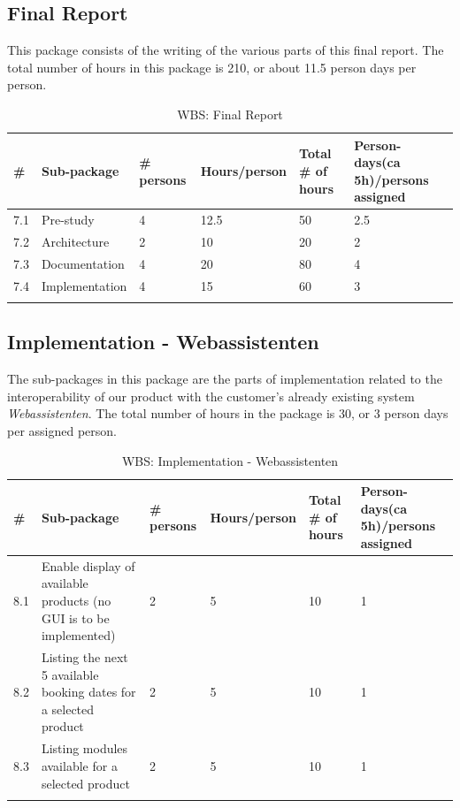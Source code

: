\subsection{Final Report}
This package consists of the writing of the various parts of this final report. The total number of hours in this package is 210, or about 11.5 person days per person.
\begin{longtable}{|p{0.7cm}|p{3cm}|p{1.8cm}|p{2.5cm}|p{2cm}|p{2.8cm}|}
\hline
\# & Sub-package & \# persons & Hours/person & Total \# of hours & Person-days(ca 5h)/persons assigned\\ 
\hline
7.1 & Pre-study & 4 & 12.5 & 50 & 2.5\\ 
\hline
7.2 & Architecture & 2 & 10 & 20 & 2\\ 
\hline
7.3 & Documentation & 4 & 20 & 80 & 4\\ 
\hline
7.4 & Implementation & 4 & 15 & 60 & 3\\ 
\hline
\caption{WBS: Final Report}
\end{longtable}

\subsection{Implementation - Webassistenten}
The sub-packages in this package are the parts of implementation related to the interoperability of our product with the customer's already existing system \\ \emph{Webassistenten}. The total number of hours in the package is 30, or 3 person days per assigned person.
\begin{longtable}{|p{0.7cm}|p{3cm}|p{1.8cm}|p{2.5cm}|p{2cm}|p{2.8cm}|}
\hline
\# & Sub-package & \# persons & Hours/person & Total \# of hours & Person-days(ca 5h)/persons assigned\\ 
\hline
8.1 & Enable display of available products (no GUI is to be implemented) & 2 & 5 & 10 & 1\\ 
\hline
8.2 & Listing the next 5 available booking dates for a selected product & 2 & 5 & 10 & 1\\ 
\hline
8.3 & Listing modules available for a selected product & 2 & 5 & 10 & 1\\ 
\hline
\caption{WBS: Implementation - Webassistenten}
\end{longtable}

